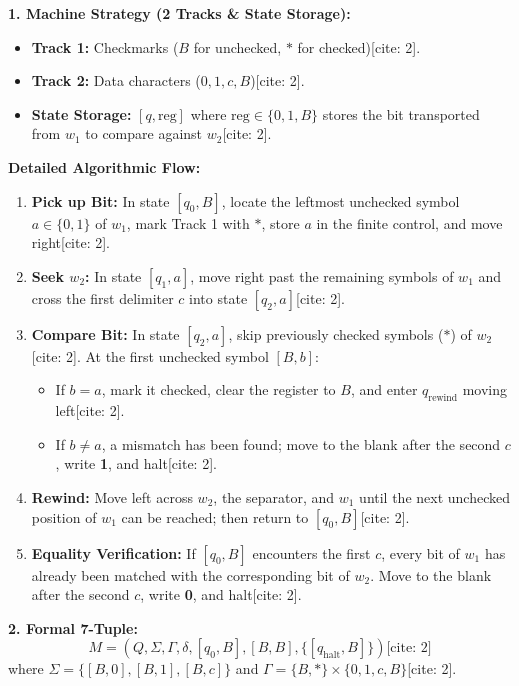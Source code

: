 \documentclass[11pt,a4paper]{article}
\begin{document}
\begin{solutionbox}
\textbf{1. Machine Strategy (2 Tracks \& State Storage):}
\begin{itemize}[leftmargin=*]
    \item \textbf{Track 1:} Checkmarks ($B$ for unchecked, $*$ for checked)[cite: 2].
    \item \textbf{Track 2:} Data characters ($0, 1, c, B$)[cite: 2].
    \item \textbf{State Storage:} $[q, \text{reg}]$ where $\text{reg} \in \{0, 1, B\}$ stores the bit transported from $w_1$ to compare against $w_2$[cite: 2].
\end{itemize}

\textbf{Detailed Algorithmic Flow:}
\begin{enumerate}[leftmargin=*]
    \item \textbf{Pick up Bit:} In state $[q_0,B]$, locate the leftmost unchecked symbol $a\in\{0,1\}$ of $w_1$, mark Track 1 with $*$, store $a$ in the finite control, and move right[cite: 2].
    \item \textbf{Seek $w_2$:} In state $[q_1,a]$, move right past the remaining symbols of $w_1$ and cross the first delimiter $c$ into state $[q_2,a]$[cite: 2].
    \item \textbf{Compare Bit:} In state $[q_2,a]$, skip previously checked symbols ($*$) of $w_2$[cite: 2]. At the first unchecked symbol $[B,b]$:
    \begin{itemize}
        \item If $b=a$, mark it checked, clear the register to $B$, and enter $q_{\text{rewind}}$ moving left[cite: 2].
        \item If $b\ne a$, a mismatch has been found; move to the blank after the second $c$, write \textbf{1}, and halt[cite: 2].
    \end{itemize}
    \item \textbf{Rewind:} Move left across $w_2$, the separator, and $w_1$ until the next unchecked position of $w_1$ can be reached; then return to $[q_0,B]$[cite: 2].
    \item \textbf{Equality Verification:} If $[q_0,B]$ encounters the first $c$, every bit of $w_1$ has already been matched with the corresponding bit of $w_2$. Move to the blank after the second $c$, write \textbf{0}, and halt[cite: 2].
\end{enumerate}

\textbf{2. Formal 7-Tuple:}
$$M = (Q, \Sigma, \Gamma, \delta, [q_0, B], [B, B], \{[q_{\text{halt}}, B]\}) \text{[cite: 2]}$$
where $\Sigma = \{[B, 0], [B, 1], [B, c]\}$ and $\Gamma = \{B, *\} \times \{0, 1, c, B\}$[cite: 2].


\end{solutionbox}
\end{document}
